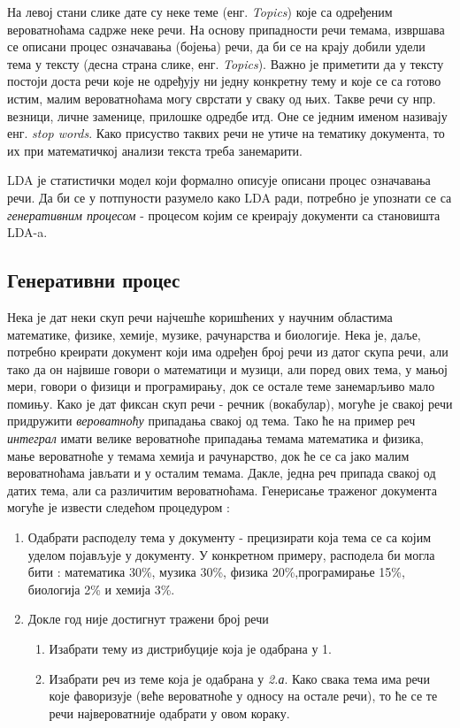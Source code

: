 На левој стани слике дате су неке теме (енг. \textit{Topics}) које са одређеним вероватноћама садрже неке речи. На основу припадности речи темама, извршава се описани процес означавања (бојења) речи, да би се на крају добили удели тема у тексту (десна страна слике, енг. \textit{Topics}).
Важно је приметити да у тексту постоји доста речи које не одређују ни једну конкретну тему и које се са готово истим, малим вероватноћама могу сврстати у сваку од њих. Такве речи су нпр. везници, личне заменице, прилошке одредбе итд. Оне се једним именом називају енг. \textit{stop words}. Како присуство таквих речи не утиче на тематику документа, то их при математичкој анализи текста треба занемарити. 


LDA је статистички модел који формално описује описани процес означавања речи. Да би се у потпуности разумело како LDA ради, потребно је упознати се са  \textit{генеративним процесом} - процесом којим се креирају документи са становишта LDA-a.

\subsection{Генеративни процес}
Нека је дат неки скуп речи најчешће коришћених у научним областима математике, физике, хемије, музике, рачунарства и биологије. Нека је, даље, потребно креирати документ који има одређен број речи из датог скупа речи, али тако да он највише говори о  математици и музици, али поред ових тема, у мањој мери, говори о физици и програмирању, док се остале теме занемарљиво мало помињу.
Како је дат фиксан скуп речи - речник (вокабулар), могуће је свакој речи придружити \textit{вероватноћу} припадања свакој од тема. Тако ће на пример реч \textit{интеграл} имати велике вероватноће припадања темама математика и физика, мање вероватноће у темама хемија и рачунарство, док ће се са јако малим вероватноћама јављати и у осталим темама. Дакле, једна реч припада свакој од датих тема, али са различитим вероватноћама. Генерисање траженог документа могуће је извести следећом процедуром :

\begin{enumerate}
 \item Одабрати расподелу тема у документу - прецизирати која тема се са којим уделом појављује у документу. У конкретном примеру, расподела би могла бити : математика 30\%, музика 30\%, физика 20\%,програмирање 15\%, биологија 2\% и хемија 3\%.

\item Докле год није достигнут тражени број речи
 	\begin{enumerate}
	\item Изабрати тему из дистрибуције која је одабрана у 1.
	\item Изабрати реч из теме која је одабрана у \textit{2.а}. Како свака тема има речи које фаворизује (веће вероватноће у односу на остале речи), то ће се те речи највероватније одабрати у овом кораку.
	\end{enumerate}

\end{enumerate}

